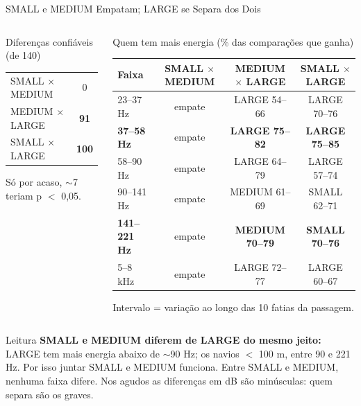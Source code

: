 \documentclass[aspectratio=169]{beamer}
\newcommand{\cahi}[1]{\cellcolor{green!30}\textbf{#1}}
\newcommand{\calo}[1]{\cellcolor{red!20}#1}
\begin{document}
\begin{frame}{SMALL e MEDIUM Empatam; LARGE se Separa dos Dois}
    \footnotesize
    \begin{columns}[t]
        \begin{block}{\small Diferenças confiáveis (de 140)}
            \scriptsize
            \centering
            \begin{tabular}{lc}
            \toprule
            SMALL $\times$ MEDIUM & \calo{0} \\
            MEDIUM $\times$ LARGE & \cahi{91} \\
            SMALL $\times$ LARGE & \cahi{100} \\
            \bottomrule
            \end{tabular}

            \vspace{0.05cm}
            {\tiny Só por acaso, $\sim$7 teriam p $<$ 0,05.\par}
        \end{block}
        \begin{block}{\small Quem tem mais energia (\% das comparações que ganha)}
            \tiny
            \centering
            \setlength{\tabcolsep}{3pt}
            \begin{tabular}{lccc}
            \toprule
            Faixa & SMALL $\times$ MEDIUM & MEDIUM $\times$ LARGE & SMALL $\times$ LARGE \\
            \midrule
            23--37 Hz & empate & LARGE 54--66 & LARGE 70--76 \\
            \textbf{37--58 Hz} & empate & \textbf{LARGE 75--82} & \textbf{LARGE 75--85} \\
            58--90 Hz & empate & LARGE 64--79 & LARGE 57--74 \\
            90--141 Hz & empate & MEDIUM 61--69 & SMALL 62--71 \\
            \textbf{141--221 Hz} & empate & \textbf{MEDIUM 70--79} & \textbf{SMALL 70--76} \\
            5--8 kHz & empate & LARGE 72--77 & LARGE 60--67 \\
            \bottomrule
            \end{tabular}

            \vspace{0.05cm}
            {\tiny Intervalo = variação ao longo das 10 fatias da passagem.\par}
        \end{block}
    \end{columns}
    \vspace{0.05cm}
    \begin{alertblock}{Leitura}
        \scriptsize
        \textbf{SMALL e MEDIUM diferem de LARGE do mesmo jeito:} LARGE tem mais energia abaixo de $\sim$90 Hz; os navios $<$ 100 m, entre 90 e 221 Hz. Por isso juntar SMALL e MEDIUM funciona. Entre SMALL e MEDIUM, nenhuma faixa difere. Nos agudos as diferenças em dB são minúsculas: quem separa são os graves.
    \end{alertblock}
\end{frame}
\end{document}

